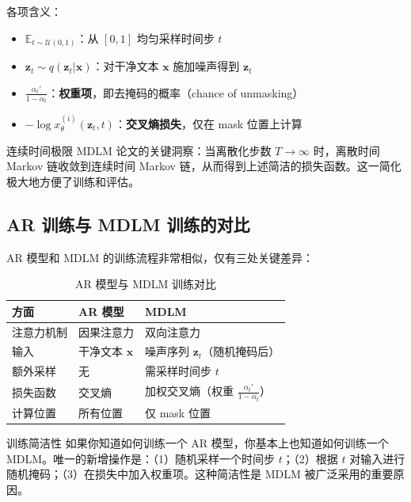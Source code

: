 \documentclass[a4paper]{article}
\begin{document}
各项含义：
\begin{itemize}
    \item $\mathbb{E}_{t \sim \mathcal{U}(0,1)}$：从 $[0, 1]$ 均匀采样时间步 $t$
    \item $\mathbf{z}_t \sim q(\mathbf{z}_t | \mathbf{x})$：对干净文本 $\mathbf{x}$ 施加噪声得到 $\mathbf{z}_t$
    \item $\frac{\alpha_t'}{1 - \alpha_t}$：\textbf{权重项}，即去掩码的概率（chance of unmasking）
    \item $-\log x_\theta^{(i)}(\mathbf{z}_t, t)$：\textbf{交叉熵损失}，仅在 mask 位置上计算
\end{itemize}

\begin{importantbox}{连续时间极限}
MDLM 论文的关键洞察：当离散化步数 $T \to \infty$ 时，离散时间 Markov 链收敛到连续时间 Markov 链，从而得到上述简洁的损失函数。这一简化极大地方便了训练和评估。
\end{importantbox}

\subsection{AR 训练与 MDLM 训练的对比}

AR 模型和 MDLM 的训练流程非常相似，仅有三处关键差异：

\begin{table}[H]
\centering
\caption{AR 模型与 MDLM 训练对比}
\begin{tabular}{@{}lll@{}}
\toprule
\textbf{方面} & \textbf{AR 模型} & \textbf{MDLM} \\
\midrule
注意力机制 & 因果注意力 & 双向注意力 \\
输入 & 干净文本 $\mathbf{x}$ & 噪声序列 $\mathbf{z}_t$（随机掩码后） \\
额外采样 & 无 & 需采样时间步 $t$ \\
损失函数 & 交叉熵 & 加权交叉熵（权重 $\frac{\alpha_t'}{1-\alpha_t}$） \\
计算位置 & 所有位置 & 仅 mask 位置 \\
\bottomrule
\end{tabular}
\end{table}

\begin{knowledgebox}{训练简洁性}
如果你知道如何训练一个 AR 模型，你基本上也知道如何训练一个 MDLM。唯一的新增操作是：（1）随机采样一个时间步 $t$；（2）根据 $t$ 对输入进行随机掩码；（3）在损失中加入权重项。这种简洁性是 MDLM 被广泛采用的重要原因。
\end{knowledgebox}
\end{document}

